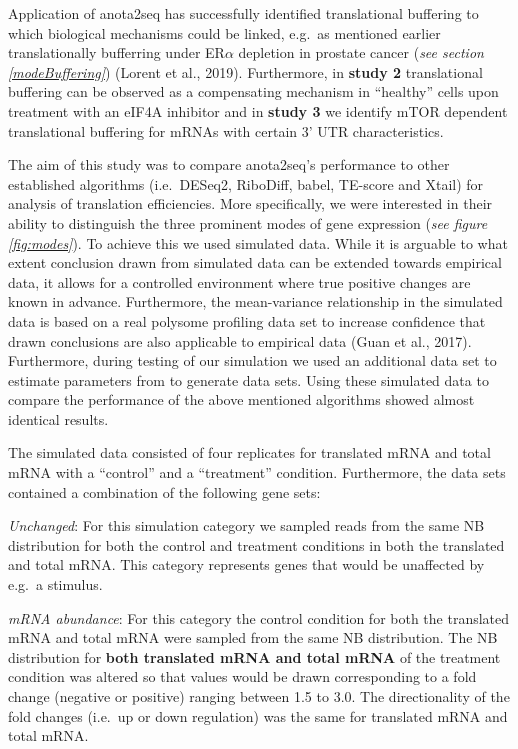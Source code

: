 \documentclass[12pt,openany]{book}
\begin{document}
Application of anota2seq has successfully identified translational
buffering to which biological mechanisms could be linked, e.g.~as
mentioned earlier translationally bufferring under ER\(\alpha\)
depletion in prostate cancer (\emph{see section \ref{modeBuffering}})
(Lorent et al., 2019). Furthermore, in \textbf{study 2} translational
buffering can be observed as a compensating mechanism in ``healthy''
cells upon treatment with an eIF4A inhibitor and in \textbf{study 3} we
identify mTOR dependent translational buffering for mRNAs with certain
3' UTR characteristics.

The aim of this study was to compare anota2seq's performance to other
established algorithms (i.e.~DESeq2, RiboDiff, babel, TE-score and
Xtail) for analysis of translation efficiencies. More specifically, we
were interested in their ability to distinguish the three prominent
modes of gene expression (\emph{see figure \ref{fig:modes}}). To achieve
this we used simulated data. While it is arguable to what extent
conclusion drawn from simulated data can be extended towards empirical
data, it allows for a controlled environment where true positive changes
are known in advance. Furthermore, the mean-variance relationship in the
simulated data is based on a real polysome profiling data set to
increase confidence that drawn conclusions are also applicable to
empirical data (Guan et al., 2017). Furthermore, during testing of our
simulation we used an additional data set to estimate parameters from to
generate data sets. Using these simulated data to compare the
performance of the above mentioned algorithms showed almost identical
results.

The simulated data consisted of four replicates for translated mRNA and
total mRNA with a ``control'' and a ``treatment'' condition.
Furthermore, the data sets contained a combination of the following gene
sets:

\emph{Unchanged}: For this simulation category we sampled reads from the
same NB distribution for both the control and treatment conditions in
both the translated and total mRNA. This category represents genes that
would be unaffected by e.g.~a stimulus.

\emph{mRNA abundance}: For this category the control condition for both
the translated mRNA and total mRNA were sampled from the same NB
distribution. The NB distribution for \textbf{both translated mRNA and
total mRNA} of the treatment condition was altered so that values would
be drawn corresponding to a fold change (negative or positive) ranging
between 1.5 to 3.0. The directionality of the fold changes (i.e.~up or
down regulation) was the same for translated mRNA and total mRNA.
\end{document}
